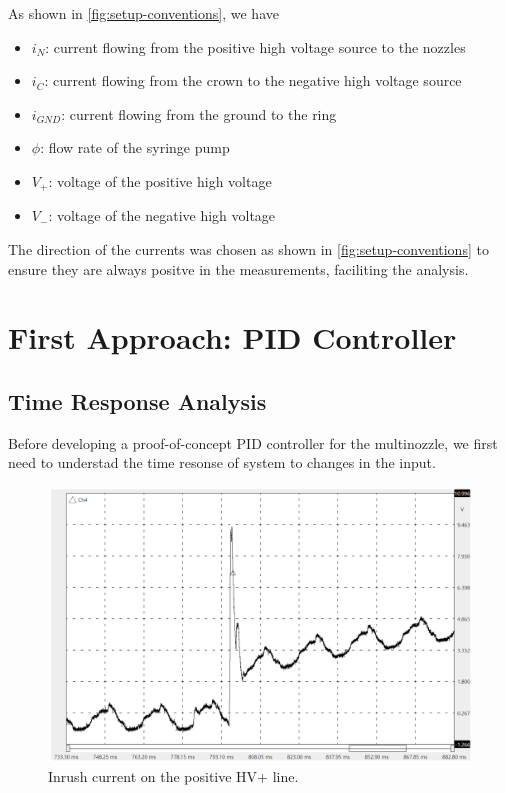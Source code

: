 \documentclass[oneside,12pt]{article}
\begin{document}
As shown in \autoref{fig:setup-conventions}, we have

\begin{itemize}
    \item $i_N$: current flowing from the positive high voltage source to the nozzles
    \item $i_C$: current flowing from the crown to the negative high voltage source
    \item $i_{GND}$: current flowing from the ground to the ring
    \item $\phi$: flow rate of the syringe pump
    \item $V_+$: voltage of the positive high voltage
    \item $V_-$: voltage of the negative high voltage
\end{itemize}

The direction of the currents was chosen as shown in \autoref{fig:setup-conventions} to ensure they are always positve 
in the measurements, faciliting the analysis.


\section{First Approach: PID Controller}

\subsection{Time Response Analysis}

Before developing a proof-of-concept PID controller for the multinozzle, we first 
need to understad the time resonse of system to changes in the input.

\begin{figure}[h!]
    \centering
    \includegraphics[width=.8\textwidth,trim=1 1 1 1,clip]{figures/inrush-current.png}
    \caption{Inrush current on the positive HV+ line.}
    \label{fig:inrush-current}
\end{figure}
\end{document}
